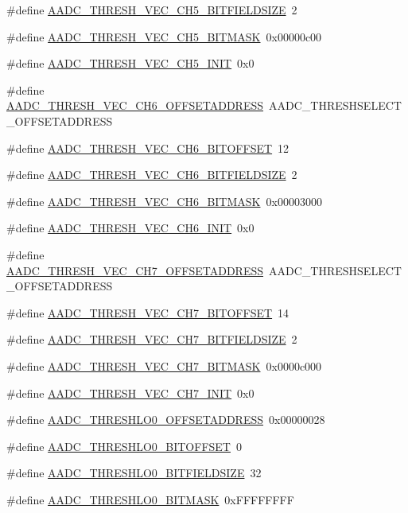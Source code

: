 \begin{DoxyCompactItemize}
\#define \hyperlink{a00543_aad529f781b573eea3d65c04b7c7941eb}{AADC\_\-THRESH\_\-VEC\_\-CH5\_\-BITFIELDSIZE}~2
\item 
\#define \hyperlink{a00543_a528ee99716fed31ddfbb9b64a8b3f7e4}{AADC\_\-THRESH\_\-VEC\_\-CH5\_\-BITMASK}~0x00000c00
\item 
\#define \hyperlink{a00543_a0aad7f7fd29d6708b7986f6e63f370f1}{AADC\_\-THRESH\_\-VEC\_\-CH5\_\-INIT}~0x0
\item 
\#define \hyperlink{a00543_a94ec622bf918d5cfb4135966dec252a5}{AADC\_\-THRESH\_\-VEC\_\-CH6\_\-OFFSETADDRESS}~AADC\_\-THRESHSELECT\_\-OFFSETADDRESS
\item 
\#define \hyperlink{a00543_aaadf9684133d0f767d40d081db47d989}{AADC\_\-THRESH\_\-VEC\_\-CH6\_\-BITOFFSET}~12
\item 
\#define \hyperlink{a00543_a3beda89e41e2f764b4e91e65488740c7}{AADC\_\-THRESH\_\-VEC\_\-CH6\_\-BITFIELDSIZE}~2
\item 
\#define \hyperlink{a00543_a4d82296f7a0d6ca9fd55e517a2587de5}{AADC\_\-THRESH\_\-VEC\_\-CH6\_\-BITMASK}~0x00003000
\item 
\#define \hyperlink{a00543_a2940098c35be9a7cc2aeee707a0aba62}{AADC\_\-THRESH\_\-VEC\_\-CH6\_\-INIT}~0x0
\item 
\#define \hyperlink{a00543_a06a7b32f839638318b8020ec255c8ffb}{AADC\_\-THRESH\_\-VEC\_\-CH7\_\-OFFSETADDRESS}~AADC\_\-THRESHSELECT\_\-OFFSETADDRESS
\item 
\#define \hyperlink{a00543_a80aafb13716d56213d07f1bf1cf8d9b7}{AADC\_\-THRESH\_\-VEC\_\-CH7\_\-BITOFFSET}~14
\item 
\#define \hyperlink{a00543_a00e478e530d4abc0f5439a09a7126110}{AADC\_\-THRESH\_\-VEC\_\-CH7\_\-BITFIELDSIZE}~2
\item 
\#define \hyperlink{a00543_a30add7c414583126ec164b8ea3734c57}{AADC\_\-THRESH\_\-VEC\_\-CH7\_\-BITMASK}~0x0000c000
\item 
\#define \hyperlink{a00543_a1eed948842db06d8b3bd6d02b1b31898}{AADC\_\-THRESH\_\-VEC\_\-CH7\_\-INIT}~0x0
\item 
\#define \hyperlink{a00543_a80294904bd0b0caf9a873f127168317d}{AADC\_\-THRESHLO0\_\-OFFSETADDRESS}~0x00000028
\item 
\#define \hyperlink{a00543_ae4d3e712c9ebd96938b8502907a3939f}{AADC\_\-THRESHLO0\_\-BITOFFSET}~0
\item 
\#define \hyperlink{a00543_a88b31e0f73d7e0af69d0f05f38ab2a2c}{AADC\_\-THRESHLO0\_\-BITFIELDSIZE}~32
\item 
\#define \hyperlink{a00543_a33eb44c2ade73a4d81022522701e0c2b}{AADC\_\-THRESHLO0\_\-BITMASK}~0xFFFFFFFF

\end{DoxyCompactItemize}
